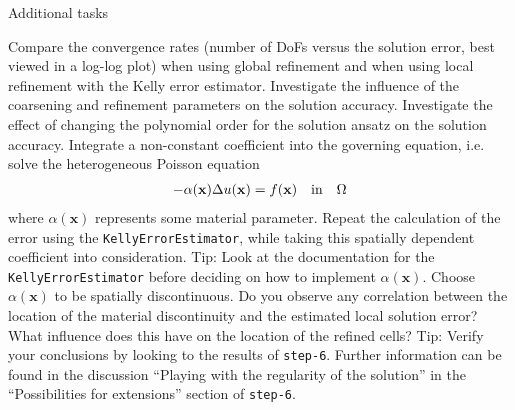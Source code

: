 \documentclass[11pt,answers]{exam}
\begin{document}
\begin{questions}

\question Additional tasks
\begin{parts}
\bonuspart Compare the convergence rates (number of DoFs versus the solution error, best viewed in a log-log plot) when using global refinement and when using local refinement with the Kelly error estimator.
\bonuspart Investigate the influence of the coarsening and refinement parameters on the solution accuracy.
\bonuspart Investigate the effect of changing the polynomial order for the solution ansatz on the solution accuracy.
\bonuspart Integrate a non-constant coefficient into the governing equation, i.e. solve the heterogeneous Poisson equation
\begin{gather*}
-\alpha(\mathbf{x}) \Delta u(\mathbf{x}) = f(\mathbf{x}) \quad \textnormal{in} \quad \Omega
\end{gather*}
where $\alpha(\mathbf{x})$ represents some material parameter.
Repeat the calculation of the error using the \verb|KellyErrorEstimator|, while taking this spatially dependent coefficient into consideration. 
Tip: Look at the documentation for the \verb|KellyErrorEstimator| before deciding on how to implement $\alpha(\mathbf{x})$.
\bonuspart Choose $\alpha(\mathbf{x})$ to be spatially discontinuous.
Do you observe any correlation between the location of the material discontinuity and the estimated local solution error?
What influence does this have on the location of the refined cells?
Tip: Verify your conclusions by looking to the results of \verb|step-6|.
Further information can be found in the discussion ``Playing with the regularity of the solution'' in the ``Possibilities for extensions'' section of \verb|step-6|.
\end{parts}


\end{questions}
\end{document}
